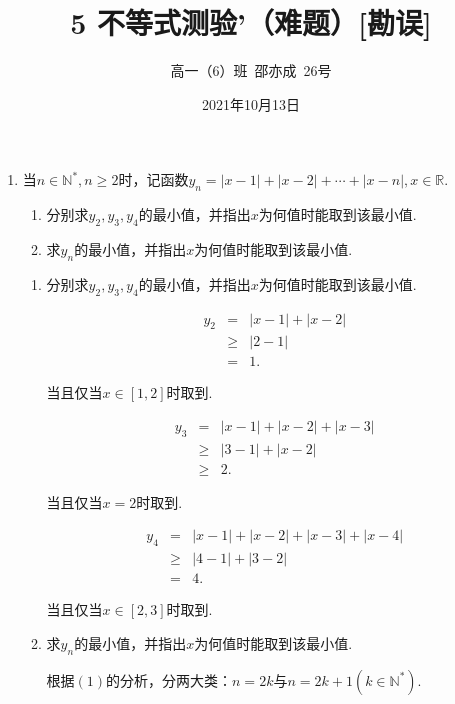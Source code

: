\documentclass[8pt]{article}
\author{高一（6）班\ 邵亦成\ 26号}
\title{5 不等式测验'（难题）[勘误]}
\date{2021年10月13日}
\begin{document}
	\maketitle

	\begin{enumerate}

		\item
			当$n\in \mathbb{N}^{*}, n\geq2$时，记函数$y_n=|x-1|+|x-2|+\cdots+|x-n|, x\in\mathbb{R}.$

			\begin{enumerate} [$(1)$]
				\item
					分别求$y_2, y_3, y_4$的最小值，并指出$x$为何值时能取到该最小值.

				\item
					求$y_n$的最小值，并指出$x$为何值时能取到该最小值.

			\end{enumerate}

			\begin{enumerate} [$(1)$]
				\item
					分别求$y_2, y_3, y_4$的最小值，并指出$x$为何值时能取到该最小值.

					$$
					\begin{array}{rcl}
						y_2&=&|x-1|+|x-2|\\
						&\geq&|2-1|\\
						&=&1.
					\end{array}
					$$

					当且仅当$x\in[1,2]$时取到.

					$$
					\begin{array}{rcl}
						y_3&=&|x-1|+|x-2|+|x-3|\\
						&\geq&|3-1|+|x-2|\\
						&\geq&2.
					\end{array}
					$$

					当且仅当$x=2$时取到.

					$$
					\begin{array}{rcl}
						y_4&=&|x-1|+|x-2|+|x-3|+|x-4|\\
						&\geq&|4-1|+|3-2|\\
						&=&4.
					\end{array}
					$$

					当且仅当$x\in[2,3]$时取到.

				\item
					求$y_n$的最小值，并指出$x$为何值时能取到该最小值.

					根据$(1)$的分析，分两大类：$n=2k$与$n=2k+1$$(k\in\mathbb{N}^{*})$.


\end{enumerate}
\end{enumerate}
\end{document}
